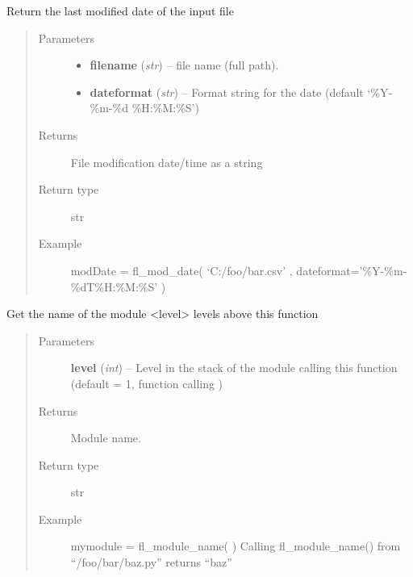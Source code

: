 \documentclass[letterpaper,10pt,english]{sphinxmanual}
\begin{document}
\begin{fulllineitems}
\label{docs/utilities:utilities.files.fl_mod_date}
Return the last modified date of the input file
\begin{quote}\begin{description}
\item[{Parameters}] \leavevmode\begin{itemize}
\item {} 
\textbf{filename} (\emph{str}) -- file name (full path).

\item {} 
\textbf{dateformat} (\emph{str}) -- Format string for the date (default
`\%Y-\%m-\%d \%H:\%M:\%S')

\end{itemize}

\item[{Returns}] \leavevmode
File modification date/time as a string

\item[{Return type}] \leavevmode
str

\item[{Example }] \leavevmode
modDate = fl\_mod\_date( `C:/foo/bar.csv' ,
dateformat='\%Y-\%m-\%dT\%H:\%M:\%S' )

\end{description}\end{quote}

\end{fulllineitems}



\begin{fulllineitems}
\label{docs/utilities:utilities.files.fl_module_name}
Get the name of the module \textless{}level\textgreater{} levels above this function
\begin{quote}\begin{description}
\item[{Parameters}] \leavevmode
\textbf{level} (\emph{int}) -- Level in the stack of the module calling this function
(default = 1, function calling )

\item[{Returns}] \leavevmode
Module name.

\item[{Return type}] \leavevmode
str

\item[{Example }] \leavevmode
mymodule = fl\_module\_name( ) Calling fl\_module\_name() from
``/foo/bar/baz.py'' returns ``baz''

\end{description}\end{quote}

\end{fulllineitems}
\end{document}
